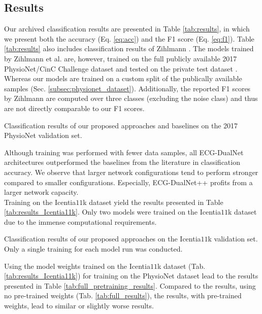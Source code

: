 \subsection{Results} \label{subsec:results}

Our archived classification results are presented in Table \ref{tab:results}, in which we present both the accuracy (Eq. \ref{eq:acc}) and the F1 score (Eq. \ref{eq:f1}). Table \ref{tab:results} also includes classification results of Zihlmann \etal \cite{Zihlmann2017}. The models trained by Zihlmann et al. are, however, trained on the full publicly available 2017 PhysioNet/CinC Challenge dataset and tested on the private test dataset \cite{Zihlmann2017}. Whereas our models are trained on a custom split of the publically available samples (Sec. \ref{subsec:physionet_dataset}). Additionally, the reported F1 scores by Zihlmann \etal are computed over three classes (excluding the noise class) and thus are not directly comparable to our F1 scores.

\begin{table}[h!]
    \centering
    \caption{Classification results of our proposed approaches and baselines on the 2017 PhysioNet validation set.}
    
    \label{tab:results}
\end{table}

Although training was performed with fewer data samples, all ECG-DualNet architectures outperformed the baselines from the literature in classification accuracy. We observe that larger network configurations tend to perform stronger compared to smaller configurations. Especially, ECG-DualNet++ profits from a larger network capacity.\\
Training on the Icentia$11$k dataset \cite{Tan2019} yield the results presented in Table \ref{tab:results_Icentia11k}. Only two models were trained on the Icentia$11$k dataset due to the immense computational requirements.

\begin{table}[!ht]
    \centering
    \caption{Classification results of our proposed approaches on the Icentia$11$k validation set. Only a single training for each model run was conducted.}
    
    \label{tab:results_Icentia11k}
\end{table}

Using the model weights trained on the Icentia$11$k dataset (Tab. \ref{tab:results_Icentia11k}) for training on the PhysioNet dataset lead to the results presented in Table \ref{tab:full_pretraining_results}. Compared to the results, using no pre-trained weights (Tab. \ref{tab:full_results}), the results, with pre-trained weights, lead to similar or slightly worse results.

